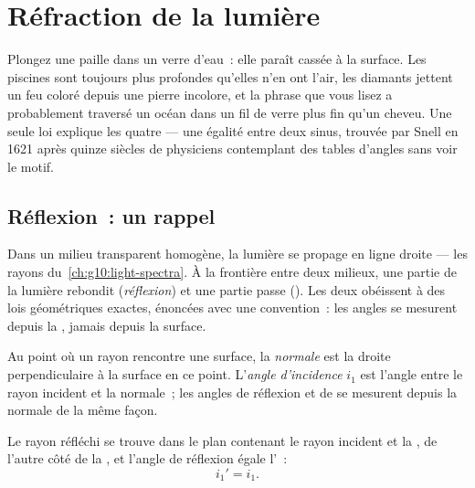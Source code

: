 \chapter{Réfraction de la lumière}\label{ch:g10:refraction}

Plongez une paille dans un verre d'eau~: elle paraît cassée à la surface.
Les piscines sont toujours plus profondes qu'elles n'en ont l'air, les
diamants jettent un feu coloré depuis une pierre incolore, et la phrase
que vous lisez a probablement traversé un océan dans un fil de verre
plus fin qu'un cheveu. Une seule loi explique les quatre --- une égalité
entre deux sinus, trouvée par Snell en 1621 après quinze siècles de
physiciens contemplant des tables d'angles sans voir le motif.

\section{Réflexion~: un rappel}

Dans un milieu transparent homogène, la lumière se propage en ligne
droite --- les rayons du~\cref{ch:g10:light-spectra}. À la frontière
entre deux milieux, une partie de la lumière rebondit
(\emph{réflexion}) et une partie passe (\emph{}). Les deux
obéissent à des lois géométriques exactes, énoncées avec une
convention~: les angles se mesurent depuis la
\emph{}, jamais depuis la surface.

\begin{definition}\label{def:g10:refraction:angles}
Au point où un rayon rencontre une surface, la
\emph{normale} est la droite perpendiculaire à la
surface en ce point. L'\emph{angle d'incidence} $i_1$ est l'angle entre le rayon incident et la
normale~; les angles de réflexion et de  se mesurent
depuis la normale de la même façon.
\end{definition}

\begin{proposition}\label{prop:g10:refraction:reflection}
Le rayon réfléchi se trouve dans le plan contenant le rayon incident et
la , de l'autre côté de la , et l'angle de
réflexion égale l'~:
\[
i_1' = i_1 .
\]
\end{proposition}
\admitted

